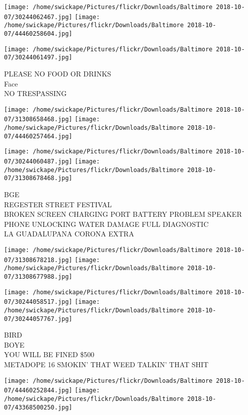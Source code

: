 \documentclass[10pt,letterpaper]{article}
\begin{document}
\texttt{[image: /home/swickape/Pictures/flickr/Downloads/Baltimore 2018-10-07/30244062467.jpg]}
\texttt{[image: /home/swickape/Pictures/flickr/Downloads/Baltimore 2018-10-07/44460258604.jpg]}

\vspace{0.25in}
\texttt{[image: /home/swickape/Pictures/flickr/Downloads/Baltimore 2018-10-07/30244061497.jpg]}

PLEASE NO FOOD OR DRINKS\\
Face\\
NO TRESPASSING\\
\pagebreak

\texttt{[image: /home/swickape/Pictures/flickr/Downloads/Baltimore 2018-10-07/31308658468.jpg]}
\texttt{[image: /home/swickape/Pictures/flickr/Downloads/Baltimore 2018-10-07/44460257464.jpg]}

\texttt{[image: /home/swickape/Pictures/flickr/Downloads/Baltimore 2018-10-07/30244060487.jpg]}
\texttt{[image: /home/swickape/Pictures/flickr/Downloads/Baltimore 2018-10-07/31308678468.jpg]}

BGE\\
REGESTER STREET FESTIVAL\\
BROKEN SCREEN CHARGING PORT BATTERY PROBLEM SPEAKER PHONE UNLOCKING WATER DAMAGE FULL DIAGNOSTIC\\
LA GUADALUPANA CORONA EXTRA\\
\pagebreak

\texttt{[image: /home/swickape/Pictures/flickr/Downloads/Baltimore 2018-10-07/31308678218.jpg]}
\texttt{[image: /home/swickape/Pictures/flickr/Downloads/Baltimore 2018-10-07/31308677988.jpg]}

\texttt{[image: /home/swickape/Pictures/flickr/Downloads/Baltimore 2018-10-07/30244058517.jpg]}
\texttt{[image: /home/swickape/Pictures/flickr/Downloads/Baltimore 2018-10-07/30244057767.jpg]}

BIRD\\
BOYE\\
YOU WILL BE FINED \$500\\
METADOPE 16 SMOKIN' THAT WEED TALKIN' THAT SHIT\\
\pagebreak

\texttt{[image: /home/swickape/Pictures/flickr/Downloads/Baltimore 2018-10-07/44460252844.jpg]}
\texttt{[image: /home/swickape/Pictures/flickr/Downloads/Baltimore 2018-10-07/43368500250.jpg]}
\end{document}
